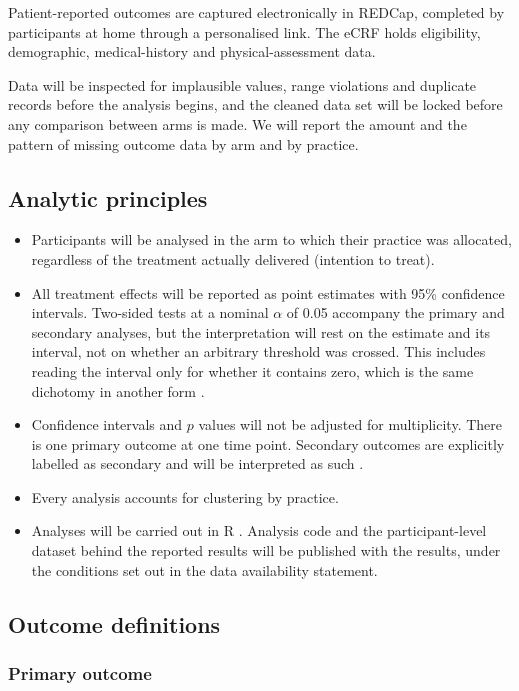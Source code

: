\documentclass[11pt,a4paper]{article}
\begin{document}
Patient-reported outcomes are captured electronically in REDCap, completed by
participants at home through a personalised link. The eCRF holds eligibility,
demographic, medical-history and physical-assessment data.

Data will be inspected for implausible values, range violations and duplicate
records before the analysis begins, and the cleaned data set will be locked
before any comparison between arms is made. We will report the amount and the
pattern of missing outcome data by arm and by practice.

\subsection{Analytic principles}

\begin{itemize}[leftmargin=1.4em, itemsep=2pt]
\item Participants will be analysed in the arm to which their practice was
allocated, regardless of the treatment actually delivered (intention to treat).
\item All treatment effects will be reported as point estimates with 95\%
confidence intervals. Two-sided tests at a nominal $\alpha$ of 0.05 accompany
the primary and secondary analyses, but the interpretation will rest on the
estimate and its interval, not on whether an arbitrary threshold was crossed.
This includes reading the interval only for whether it contains zero, which
is the same dichotomy in another form \citep{wasserstein2019, amrhein2019}.
\item Confidence intervals and $p$ values will not be adjusted for
multiplicity. There is one primary outcome at one time point. Secondary
outcomes are explicitly labelled as secondary and will be interpreted as such
\citep{gamble2017}.
\item Every analysis accounts for clustering by practice.
\item Analyses will be carried out in R \citep{rcore}. Analysis code and the
participant-level dataset behind the reported results will be published with
the results, under the conditions set out in the data availability statement.
\end{itemize}

\subsection{Outcome definitions}

\subsubsection{Primary outcome}
\end{document}
